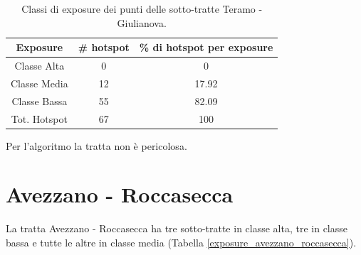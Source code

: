 \begin{table}[H]
	\centering
	\begin{tabular}{|c|c|c|}
		\hline
		\rowcolor[HTML]{C0C0C0} 
		\textbf{Exposure} & \textbf{\# hotspot} & \textbf{\% di hotspot per exposure} \\ \hline
		Classe Alta       & 0                  & 0                                   \\ \hline
		Classe Media      & 12                 & 17.92                           \\ \hline
		Classe Bassa      & 55              & 82.09                               \\ \hline
		Tot. Hotspot      & 67               & 100                                 \\ \hline
	\end{tabular}
	\caption{Classi di exposure dei punti delle sotto-tratte Teramo - Giulianova.}
	\label{risultati_teramo_giulianova}
\end{table}

Per l'algoritmo la tratta non è pericolosa.

\section{Avezzano - Roccasecca}

La tratta Avezzano - Roccasecca ha tre sotto-tratte in classe alta, tre in classe bassa e tutte le altre in classe media (Tabella \ref{exposure_avezzano_roccasecca}).

